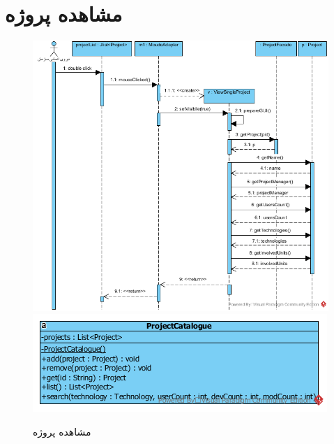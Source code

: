 \section{مشاهده پروژه}
\begin{figure}[H]
	\centering
	\includegraphics[scale=0.7]{img/sequence-design/ViewProject}
	\includegraphics[scale=0.8]{img/sequence-design/ViewProjectC}
	\caption{مشاهده پروژه}
\end{figure}



